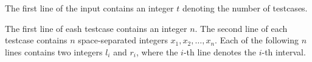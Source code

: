 The first line of the input contains an integer $t$ denoting the number of testcases.

The first line of eash testcase contains an integer $n$.
The second line of each testcase contains $n$ space-separated integers $x_1,x_2,\ldots,x_n$.
Each of the following $n$ lines contains two integers $l_i$ and $r_i$, where the $i$-th line denotes the $i$-th interval.